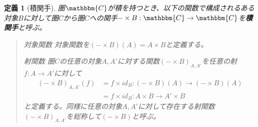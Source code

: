 \documentclass[uplatex,dvipdfmx]{jsarticle}
\newcommand{\cat}[1]{\mathbbm{#1}}
\newcommand{\arrow}{\rightarrow}
\newcommand{\functor}[3]{#1:\cat{#2}\arrow \cat{#3}}
\newcommand{\mor}[3]{#1:#2\arrow #3}
\newtheorem{define}[proof]{定義}
\numberwithin{proof}{subsection}
\newenvironment{mydescription}
{\begin{description}
  \setlength{\parskip}{0.5cm}
}
{\end{description}}
\begin{document}
	\begin{define}[積関手]
		圏$\cat{C}$が積を持つとき、以下の関数で構成されるある対象$B$に対して圏$C$から圏$C$への関手$\functor{-\times B}{C}{C}$を\textbf{積関手}と呼ぶ。
		\begin{quote}
			\begin{mydescription}
			\item[対象関数] 対象関数を$(-\times B)(A)=A\times B$と定義する。
			\item[射関数] 圏$C$の任意の対象$A,A'$に対する関数$(-\times B)_{A,A'}$を任意の射$\mor{f}{A}{A'}$に対して
			\begin{align*}
				(-\times B)_{A,A'}(f)&=\mor{f\times id_B}{(-\times B)(A)}{(-\times B)(A)}\\
				&=\mor{f\times id_B}{A\times B}{A'\times B}
			\end{align*}
			と定義する。同様に任意の対象$A,A'$に対して存在する射関数$(-\times B)_{A,A'}$を総称して$(-\times B)$と呼ぶ。
			\begin{center}
\end{center}
\end{mydescription}
\end{quote}
\end{define}
\end{document}

